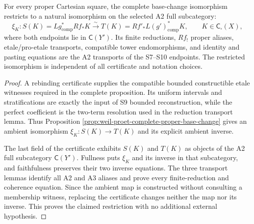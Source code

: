 \begin{lemma}
\label{lemma:weil-pbc-complete-constructible-restriction}
For every proper Cartesian square, the complete base-change isomorphism
restricts to a natural isomorphism on the selected A2 full subcategory:
\[
 \xi_K:S(K)=Lg^*_{\mathrm{comp}}Rf_*K
 \xrightarrow{\sim}
 T(K)=Rf'_*L(g')^*_{\mathrm{comp}}K,
 \qquad K\in\mathsf C_\square(X),
\]
where both endpoints lie in $\mathsf C(Y')$.  Its finite reductions, $Rf_!$
proper aliases, etale/pro-etale transports, compatible tower endomorphisms,
and identity and pasting equations are the A2 transports of the S7--S10
endpoints.  The
restricted isomorphism is independent of all certificate and notation
choices.
\end{lemma}
\begin{proof}

A rebinding certificate supplies the compatible bounded constructible etale
witnesses required in the complete proposition.  Its uniform intervals and
stratifications are exactly the input of S9 bounded reconstruction, while the
perfect coefficient is the two-term resolution used in the reduction
transport lemma.  Thus Proposition
\ref{prop:weil-proet-complete-proper-base-change} gives an ambient isomorphism
$\xi_K:S(K)\to T(K)$ and its explicit ambient inverse.

The last field of the certificate exhibits $S(K)$ and $T(K)$ as objects of
the A2 full subcategory $\mathsf C(Y')$.  Fullness puts $\xi_K$ and its inverse
in that subcategory, and faithfulness preserves their two inverse equations.
The three transport lemmas identify all A2 and A3 aliases and prove every
finite-reduction and coherence equation.  Since the ambient map is constructed
without consulting a membership witness, replacing the certificate changes
neither the map nor its inverse.  This proves the claimed restriction with no
additional external hypothesis.
\end{proof}

